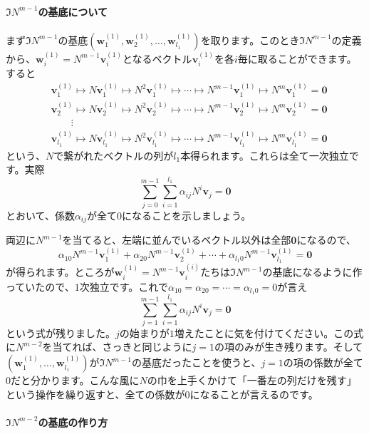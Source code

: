 \paragraph{$\Im N^{m - 1}$の基底について}

まず$\Im N^{m - 1}$の基底$(\bm{w}^{(1)}_1, \bm{w}^{(1)}_2, \ldots, \bm{w}^{(1)}_{l_1})$を取ります。このとき$\Im N^{m - 1}$の定義から、$\bm{w}^{(1)}_i = N^{m - 1} \bm{v}^{(1)}_i$となるベクトル$\bm{v}^{(1)}_i$を各$i$毎に取ることができます。すると
\begin{align*}
&\bm{v}^{(1)}_1 \mapsto N \bm{v}^{(1)}_1 \mapsto N^2 \bm{v}^{(1)}_1 \mapsto \cdots \mapsto N^{m - 1} \bm{v}^{(1)}_1 \mapsto N^m \bm{v}^{(1)}_1 = \bm{0} \\
&\bm{v}^{(1)}_2 \mapsto N \bm{v}^{(1)}_2 \mapsto N^2 \bm{v}^{(1)}_2 \mapsto \cdots \mapsto N^{m - 1} \bm{v}^{(1)}_2 \mapsto N^m \bm{v}^{(1)}_2 = \bm{0} \\
&\qquad \vdots \\
&\bm{v}^{(1)}_{l_1} \mapsto N \bm{v}^{(1)}_{l_1} \mapsto N^2 \bm{v}^{(1)}_{l_1} \mapsto \cdots \mapsto N^{m - 1} \bm{v}^{(1)}_{l_1} \mapsto N^m \bm{v}^{(1)}_{l_1} = \bm{0}
\end{align*}
という、$N$で繋がれたベクトルの列が$l_1$本得られます。これらは全て一次独立です。実際
\[
\sum_{j = 0}^{m - 1} \sum_{i = 1}^{l_1} \alpha_{ij} N^i \bm{v}_j = \bm{0}
\]
とおいて、係数$\alpha_{ij}$が全て$0$になることを示しましょう。

両辺に$N^{m - 1}$を当てると、左端に並んでいるベクトル以外は全部$\bm{0}$になるので、
\[
\alpha_{10} N^{m - 1}\bm{v}^{(1)}_1 + \alpha_{20} N^{m - 1} \bm{v}^{(1)}_2 + \cdots + \alpha_{l_1 0} N^{m - 1}\bm{v}^{(1)}_{l_1} = \bm{0}
\]
が得られます。ところが$\bm{w}^{(1)}_i = N^{m - 1} \bm{v}^{(i)}_i$たちは$\Im N^{m - 1}$の基底になるように作っていたので、$1$次独立です。これで$\alpha_{10} = \alpha_{20} = \cdots = \alpha_{l_1 0} = 0$が言え
\[
\sum_{j = 1}^{m - 1} \sum_{i = 1}^{l_1} \alpha_{ij} N^i \bm{v}_j = \bm{0}
\]
という式が残りました。$j$の始まりが$1$増えたことに気を付けてください。この式に$N^{m - 2}$を当てれば、さっきと同じように$j = 1$の項のみが生き残ります。そして$(\bm{w}^{(1)}_1, \ldots, \bm{w}^{(1)}_{l_1})$が$\Im N^{m - 1}$の基底だったことを使うと、$j = 1$の項の係数が全て$0$だと分かります。こんな風に$N$の巾を上手くかけて「一番左の列だけを残す」という操作を繰り返すと、全ての係数が$0$になることが言えるのです。

\paragraph{$\Im N^{m - 2}$の基底の作り方}

